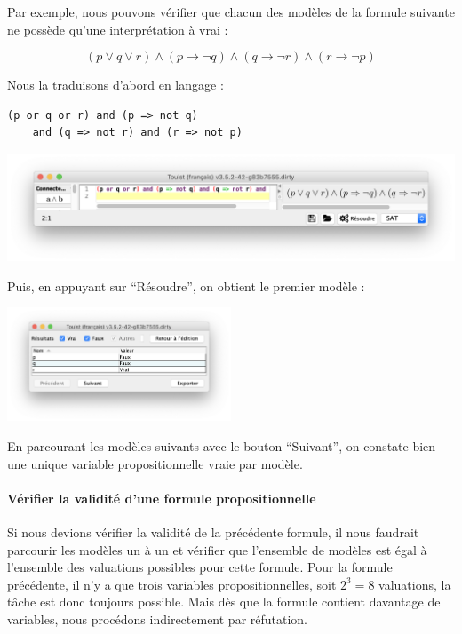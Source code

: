 Par exemple, nous pouvons vérifier que chacun des modèles de la formule suivante ne possède qu'une interprétation à vrai :

\[(p \vee q \vee r) \wedge (p \rightarrow \neg q) \wedge (q \rightarrow \neg r) \wedge (r\rightarrow \neg p)\]

\noindent
Nous la traduisons d'abord en langage \touist :

\begin{lstlisting}[language=touist,frame=single]
(p or q or r) and (p => not q)
    and (q => not r) and (r => not p)
\end{lstlisting}

\begin{center}
    \includegraphics[width=\textwidth]{figures/screenshot-formule.png}
\end{center}

\noindent
Puis, en appuyant sur \enquote{Résoudre}, on obtient le premier modèle :

\begin{center}
    \includegraphics[width=0.5\textwidth]{figures/screenshot-modele.png} \label{fig:screenshot-modele}    
\end{center}

\noindent
En parcourant les modèles suivants avec le bouton \enquote{Suivant}, on constate bien une unique variable propositionnelle vraie par modèle.

\paragraph{Vérifier la validité d'une formule propositionnelle}

Si nous devions vérifier la validité de la précédente formule, il nous faudrait parcourir les modèles un à un et vérifier que l'ensemble de modèles est égal à l'ensemble des valuations possibles pour cette formule. Pour la formule précédente, il n'y a que trois variables propositionnelles, soit $2^3 = 8$ valuations, la tâche est donc toujours possible. Mais dès que la formule contient davantage de variables, nous procédons  indirectement par réfutation.

